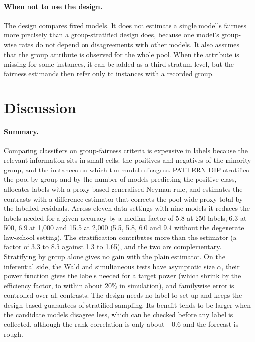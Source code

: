 \documentclass[pdflatex,sn-mathphys-num,iicol]{sn-jnl}
\theoremstyle{thmstyleone}
\theoremstyle{thmstyletwo}
\theoremstyle{thmstylethree}
\begin{document}
\paragraph{When not to use the design.} The design compares fixed models. It does not estimate a single model's fairness more precisely than a group-stratified design does, because one model's group-wise rates do not depend on disagreements with other models. It also assumes that the group attribute is observed for the whole pool. When the attribute is missing for some instances, it can be added as a third stratum level, but the fairness estimands then refer only to instances with a recorded group.

\section{Discussion}\label{sec:discussion}

\paragraph{Summary.} Comparing classifiers on group-fairness criteria is expensive in labels because the relevant information sits in small cells: the positives and negatives of the minority group, and the instances on which the models disagree. PATTERN-DIF stratifies the pool by group and by the number of models predicting the positive class, allocates labels with a proxy-based generalised Neyman rule, and estimates the contrasts with a difference estimator that corrects the pool-wide proxy total by the labelled residuals. Across eleven data settings with nine models it reduces the labels needed for a given accuracy by a median factor of 5.8 at 250 labels, 6.3 at 500, 6.9 at 1,000 and 15.5 at 2,000 (5.5, 5.8, 6.0 and 9.4 without the degenerate law-school setting). The stratification contributes more than the estimator (a factor of 3.3 to 8.6 against 1.3 to 1.65), and the two are complementary. Stratifying by group alone gives no gain with the plain estimator. On the inferential side, the Wald and simultaneous tests have asymptotic size $\alpha$, their power function gives the labels needed for a target power (which shrink by the efficiency factor, to within about 20\% in simulation), and familywise error is controlled over all contrasts. The design needs no label to set up and keeps the design-based guarantees of stratified sampling. Its benefit tends to be larger when the candidate models disagree less, which can be checked before any label is collected, although the rank correlation is only about $-0.6$ and the forecast is rough.
\end{document}
